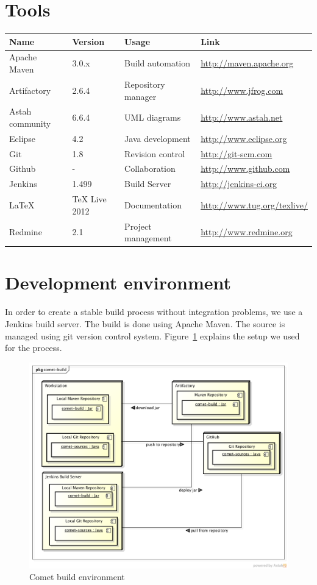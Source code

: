 \documentclass[fontsize=12pt,
               paper=a4,
               twoside=false,
               parskip=half,
               ]{scrartcl}
\begin{document}
\section{Tools}
\begin{tabular}{| l | l | l | l |}
	\hline
	\textbf{Name} & \textbf{Version} & \textbf{Usage} & \textbf{Link} \\ \hline
	Apache Maven & 3.0.x & Build automation & \url{http://maven.apache.org} \\ \hline
	Artifactory & 2.6.4 & Repository manager & \url{http://www.jfrog.com} \\ \hline
	Astah community & 6.6.4 & UML diagrams & \url{http://www.astah.net} \\ \hline
	Eclipse & 4.2 & Java development & \url{http://www.eclipse.org} \\ \hline
	Git & 1.8 & Revision control & \url{http://git-scm.com} \\ \hline
	Github & - & Collaboration & \url{http://www.github.com} \\ \hline
	Jenkins & 1.499 & Build Server & \url{http://jenkins-ci.org} \\ \hline
	LaTeX & TeX Live 2012 & Documentation & \url{http://www.tug.org/texlive/} \\ \hline
	Redmine & 2.1 & Project management & \url{http://www.redmine.org} \\ \hline
\end{tabular}

\section{Development environment}

In order to create a stable build process without integration problems, we use a Jenkins build server. The build is done using Apache Maven. The source is managed using git version control system. Figure~\ref{fig:build_environment} explains the setup we used for the process.

\begin{figure}[h!]
	\includegraphics[width=15.5cm]{./img/comet-build.png}
	\caption[Comet build environment]{Comet build environment}
	\label{fig:build_environment}
\end{figure}
\end{document}
